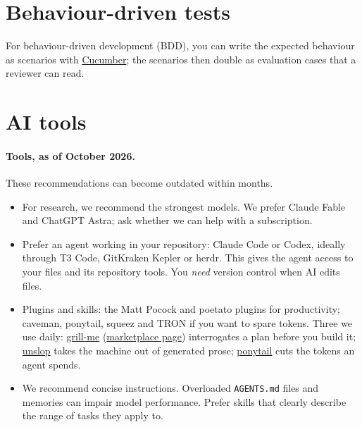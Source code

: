 \section{Behaviour-driven tests}
For behaviour-driven development (BDD), you can write the expected behaviour as scenarios with \href{https://cucumber.io/}{Cucumber}; the scenarios then double as evaluation cases that a reviewer can read.

\section{AI tools}\label{app:code:ai}
\paragraph{Tools, as of October 2026.} These recommendations can become outdated within months.
\begin{itemize}
  \item For research, we recommend the strongest models. We prefer Claude Fable and ChatGPT Astra; ask whether we can help with a subscription.
  \item Prefer an agent working in your repository: Claude Code or Codex, ideally through T3 Code, GitKraken Kepler or herdr. This gives the agent access to your files and its repository tools. You \emph{need} version control when AI edits files.
  \item Plugins and skills: the Matt Pocock and poetato plugins for productivity; caveman, ponytail, squeez and TRON if you want to spare tokens. Three we use daily: \href{https://www.aihero.dev/skills-grill-me}{grill-me} (\href{https://claudemarketplaces.com/skills/mattpocock/skills/grill-me}{marketplace page}) interrogates a plan before you build it; \href{https://github.com/cursor/plugins/blob/main/pstack/skills/unslop/SKILL.md}{unslop} takes the machine out of generated prose; \href{https://github.com/DietrichGebert/ponytail/blob/main/skills/ponytail/SKILL.md}{ponytail} cuts the tokens an agent spends.
  \item We recommend concise instructions. Overloaded \texttt{AGENTS.md} files and memories can impair model performance. Prefer skills that clearly describe the range of tasks they apply to.
\end{itemize}
